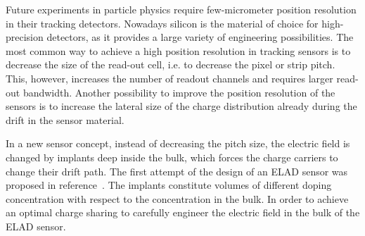 
Future experiments in particle physics require few-micrometer position resolution in their tracking detectors. 
Nowadays silicon is the material of choice for high-precision detectors, as it provides a large variety of engineering possibilities. 
The most common way to achieve a high position resolution in tracking sensors is to decrease the size of the read-out cell, i.e. to decrease the pixel or strip pitch. 
This, however, increases the number of readout channels and requires larger read-out bandwidth. 
Another possibility to improve the position resolution of the sensors is to increase the lateral size of the charge distribution already during the drift in the sensor material. 

In a new sensor concept, instead of decreasing the pitch size, the electric field is changed by implants deep inside the bulk, which forces the charge carriers to change their drift path. 
The first attempt of the design of an ELAD sensor was proposed in reference~\cite{JANSEN2016242}.
The implants constitute volumes of different doping concentration with respect to the concentration in the bulk. 
In order to achieve an optimal charge sharing to carefully engineer the electric field in the bulk of the ELAD sensor. %

